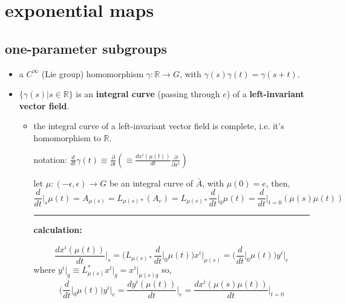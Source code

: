 \chapter{exponential maps}
\section{one-parameter subgroups}
\begin{itemize}
	\item a $C^\infty$ (Lie group) homomorphism $\gamma: \mathbb{R} \rightarrow G$, with $\gamma(s) \gamma(t) = \gamma(s + t)$.
	
	\item $\{\gamma(s) | s \in \mathbb{R}\}$ is an \textbf{integral curve} (passing through $e$) of a \textbf{left-invariant vector field}.
	
	\begin{itemize}
		\item the integral curve of a left-invariant vector field is complete, i.e. it’s homomorphism to $\mathbb{R}$.
		
		\begin{tcolorbox}[title=proof:]
			notation: $\frac{d}{dt} \gamma(t) \equiv \frac{\partial}{\partial t} (\equiv \frac{d x^i(\mu(t))}{dt} \frac{\partial}{\partial x^i})$
			
			let $\mu : (- \epsilon, \epsilon) \rightarrow G$ be an integral curve of $\bar{A}$, with $\mu(0) = e$, then,
			\begin{equation}
				\frac{d}{dt} \Big|_s \mu(t) = A_{\mu(s)} = L_{\mu(s) *} (A_e) = L_{\mu(s) *} \frac{d}{dt} \Big|_0 \mu(t) = \frac{d}{dt} \Big|_{t = 0} (\mu(s) \mu(t))
			\end{equation}
			
			\noindent\rule[0.5ex]{\linewidth}{0.5pt} %
			
			\textbf{calculation:}
			
			\begin{equation}
				\frac{d x^i(\mu(t))}{dt} \Big|_s = \Big( L_{\mu(s) *} \frac{d}{dt} \Big|_0 \mu(t) \Big) x^i \Big|_{\mu(s)} = \Big( \frac{d}{dt} \Big|_0 \mu(t) \Big) y^i \Big|_e
			\end{equation}
			where $y^i \big|_g \equiv L_{\mu(s)}^* x^i \big|_g = x^i \big|_{\mu(s) g}$
			so,
			\begin{equation}
				\Big( \frac{d}{dt} \Big|_0 \mu(t) \Big) y^i \Big|_e = \frac{d y^i(\mu(t))}{dt} \Big|_e = \frac{d x^i(\mu(s) \mu(t))}{dt} \Big|_{t = 0}
			\end{equation}
			

\end{tcolorbox}
\end{itemize}
\end{itemize}
